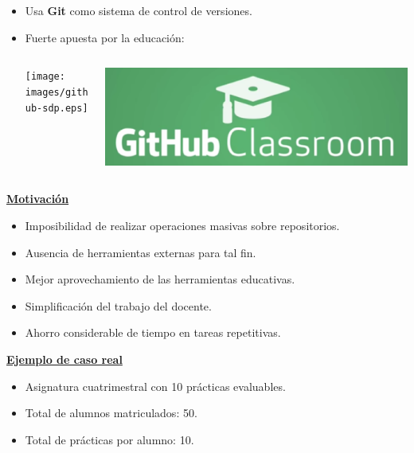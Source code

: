 \documentclass{beamer}
\begin{document}
\begin{frame}[allowframebreaks]
\begin{itemize}
       \item Usa {\bfseries Git} como sistema de control de versiones.        
	   \item Fuerte apuesta por la educación:
	   \bigskip
	   
	   	\begin{columns}
        	\begin{column}{4.5cm}
        		\texttt{[image: images/github-sdp.eps]}
        	\end{column}
        	\begin{column}{3.5cm}
          		\includegraphics[width=1.2\textwidth]{images/github-classroom.eps}
        	\end{column}
      	\end{columns}
	\end{itemize}
	\framebreak
	
	\underline{{\bfseries Motivación}} 
	\bigskip
	
	\begin{itemize}
       \item Imposibilidad de realizar operaciones masivas sobre repositorios.
	   \item Ausencia de herramientas externas para tal fin.
	   \item Mejor aprovechamiento de las herramientas educativas.
	   \item Simplificación del trabajo del docente.
	   \item Ahorro considerable de tiempo en tareas repetitivas.
	\end{itemize}
	\framebreak
	
	\underline{{\bfseries Ejemplo de caso real}}
	\bigskip
	
	\begin{itemize}
       \item Asignatura cuatrimestral con 10 prácticas evaluables.
	   \item Total de alumnos matriculados: 50.
	   \item Total de prácticas por alumno: 10.
	\end{itemize}
	

\end{frame}
\end{document}
